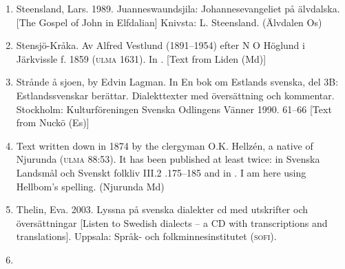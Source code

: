 \begin{enumerate}

\item[\sqbrSenum]

\label{bkm:Ref150065761}Steensland, Lars. 1989. Juanneswaundsjila: Johannesevangeliet på älvdalska. [The Gospel of John in Elfdalian] Knivsta: L. Steensland. (Älvdalen Os)

\item[\sqbrSenum]

\label{bkm:Ref154221412}\label{bkm:Ref154302630}Stensjö-Kråka. Av Alfred Vestlund (1891--1954) efter N O Höglund i Järkvissle f. 1859 (\textsc{ulma} 1631). In \citet[17--19]{Hellbom1981}. [Text from Liden (Md)]

\item[\sqbrSenum]

\label{bkm:Ref223343666}Strånde å sjoen, by Edvin Lagman. In En bok om Estlands svenska, del 3B: Estlandssvenskar berättar. Dialekttexter med översättning och kommentar. Stockholm: Kulturföreningen Svenska Odlingens Vänner 1990.  61--66 [Text from Nuckö (Es)]

\item[\sqbrSenum]

Text written down in 1874 by the clergyman O.K. Hellzén, a native of Njurunda (\textsc{ulma} 88:53). It has been published at least twice: in Svenska Landsmål och Svenskt folkliv III.2 .175--185 and in \citet[92--107]{Hellbom1981}. I am here using Hellbom’s spelling. (Njurunda Md)

\item[\sqbrSenum]

Thelin, Eva. 2003. Lyssna på svenska dialekter cd med utskrifter och översättningar [Listen to Swedish dialects – a CD with transcriptions and translations]. Uppsala: Språk- och folkminnesinstitutet (\textsc{sofi}).


\item[\sqbrSenum]


\end{enumerate}

